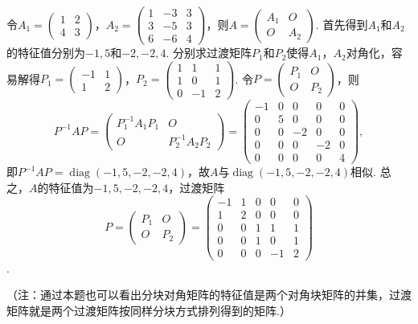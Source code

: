 \documentclass[12pt,fontset=fandol]{ctexart}
\begin{document}
\begin{solve}
令$A_1=\begin{pmatrix}
                1 & 2 \\ 4 & 3
            \end{pmatrix}$，$A_2=\begin{pmatrix}
                1 & -3 & 3 \\ 3 & -5 & 3 \\ 6 & -6 & 4
            \end{pmatrix}$，则$A=\begin{pmatrix}
                A_1 & O \\ O & A_2
            \end{pmatrix}$. 首先得到$A_1$和$A_2$的特征值分别为$-1,5$和$-2,-2,4$. 分别求过渡矩阵$P_1$和$P_2$使得$A_1$，$A_2$对角化，容易解得$P_1=\begin{pmatrix}
                -1 & 1 \\ 1 & 2
            \end{pmatrix}$，$P_2=\begin{pmatrix}
                1 & 1 & 1 \\ 1 & 0 & 1 \\ 0 & -1 & 2
            \end{pmatrix}$. 令$P=\begin{pmatrix}
                P_1 & O \\ O & P_2
            \end{pmatrix}$，则
        \[P^{-1}AP=\begin{pmatrix}
                P_1^{-1}A_1P_1 & O \\ O & P_2^{-1}A_2P_2
            \end{pmatrix}=\begin{pmatrix}
                -1 & 0 & 0 & 0 & 0 \\ 0 & 5 & 0 & 0 & 0 \\ 0 & 0 & -2 & 0 & 0 \\ 0 & 0 & 0 & -2 & 0 \\ 0 & 0 & 0 & 0 & 4
            \end{pmatrix},\]
        即$P^{-1}AP=\operatorname{diag}(-1,5,-2,-2,4)$，故$A$与$\operatorname{diag}(-1,5,-2,-2,4)$相似. 总之，$A$的特征值为$-1,5,-2,-2,4$，过渡矩阵
\[P=\begin{pmatrix}
                P_1 & O \\ O & P_2
            \end{pmatrix}=\begin{pmatrix}
                -1 & 1 & 0 & 0 & 0 \\ 1 & 2 & 0 & 0 & 0 \\ 0 & 0 & 1 & 1 & 1 \\ 0 & 0 & 1 & 0 & 1 \\ 0 & 0 & 0 & -1 & 2
            \end{pmatrix}\]
.

        （注：通过本题也可以看出分块对角矩阵的特征值是两个对角块矩阵的并集，过渡矩阵就是两个过渡矩阵按同样分块方式排列得到的矩阵.）
\end{solve}
\end{document}
